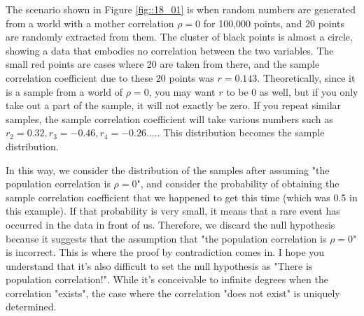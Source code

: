 \documentclass{ltjsbook}
\begin{document}
The scenario shown in Figure \ref{fig::18_01} is when random numbers are generated from a world with a mother correlation $\rho=0$ for 100,000 points, and 20 points are randomly extracted from them. The cluster of black points is almost a circle, showing a data that embodies no correlation between the two variables. The small red points are cases where 20 are taken from there, and the sample correlation coefficient due to these 20 points was $r=0.143$. Theoretically, since it is a sample from a world of $\rho=0$, you may want $r$ to be 0 as well, but if you only take out a part of the sample, it will not exactly be zero. If you repeat similar samples, the sample correlation coefficient will take various numbers such as $r_2=0.32, r_3=-0.46,r_4=-0.26....$. This distribution becomes the sample distribution.


In this way, we consider the distribution of the samples after assuming "the population correlation is $\rho=0$", and consider the probability of obtaining the sample correlation coefficient that we happened to get this time (which was 0.5 in this example). If that probability is very small, it means that a rare event has occurred in the data in front of us. Therefore, we discard the null hypothesis because it suggests that the assumption that "the population correlation is $\rho=0$" is incorrect. This is where the proof by contradiction comes in. I hope you understand that it's also difficult to set the null hypothesis as "There is population correlation!". While it's conceivable to infinite degrees when the correlation "exists", the case where the correlation "does not exist" is uniquely determined.
\end{document}
